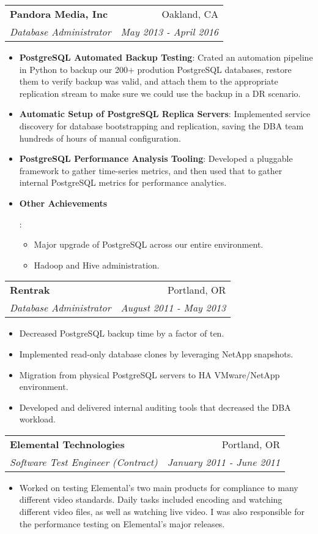 \documentclass[letterpaper,11pt]{article}
\makeatletter
\newcommand{\resumeItem}[2]{
  \item\small{
    \textbf{#1}{: #2 \vspace{-2pt}}
  }
}
\newcommand{\resumeSubheading}[4]{
  \vspace{-1pt}\item
    \begin{tabular*}{0.97\textwidth}{l@{\extracolsep{\fill}}r}
      \textbf{#1} & #2 \\
      \textit{\small#3} & \textit{\small #4} \\
    \end{tabular*}\vspace{-5pt}
}
\newcommand{\resumeItemListStart}{\begin{itemize}}
\newcommand{\resumeItemListEnd}{\end{itemize}\vspace{-5pt}}
\makeatother
\begin{document}
    \resumeSubheading
      {Pandora Media, Inc}{Oakland, CA}
      {Database Administrator}{May 2013 - April 2016}
      \resumeItemListStart
        \resumeItem{PostgreSQL Automated Backup Testing}
          {Crated an automation pipeline in Python to backup our 200+ prodution PostgreSQL databases, restore them to verify backup was valid, and attach them to the appropriate replication stream to make sure we could use the backup in a DR scenario.}
        \resumeItem{Automatic Setup of PostgreSQL Replica Servers}
          {Implemented service discovery for database bootstrapping and replication, saving the DBA team hundreds of hours of manual configuration.}
        \resumeItem{PostgreSQL Performance Analysis Tooling}
          {Developed a pluggable framework to gather time-series metrics, and then used that to gather internal PostgreSQL metrics for performance analytics.}
        \resumeItem{Other Achievements}
          {
            \begin{itemize}[noitemsep]
            \item Major upgrade of PostgreSQL across our entire environment.
            \item Hadoop and Hive administration.
            \end{itemize}
          }
      \resumeItemListEnd

    \resumeSubheading
      {Rentrak}{Portland, OR}
      {Database Administrator}{August 2011 - May 2013}
        \begin{itemize}[noitemsep]
        \item Decreased PostgreSQL backup time by a factor of ten.
        \item Implemented read-only database clones by leveraging NetApp snapshots.
        \item Migration from physical PostgreSQL servers to HA VMware/NetApp environment.
        \item Developed and delivered internal auditing tools that decreased the DBA workload.
        \end{itemize}

    \resumeSubheading
      {Elemental Technologies}{Portland, OR}
      {Software Test Engineer (Contract)}{January 2011 - June 2011}
        \begin{itemize}[noitemsep]
        \item Worked on testing Elemental's two main products for compliance to many different video standards. Daily tasks included encoding and watching different video files, as well as watching live video. I was also responsible for the performance testing on Elemental's major releases.
         \end{itemize}
\end{document}
